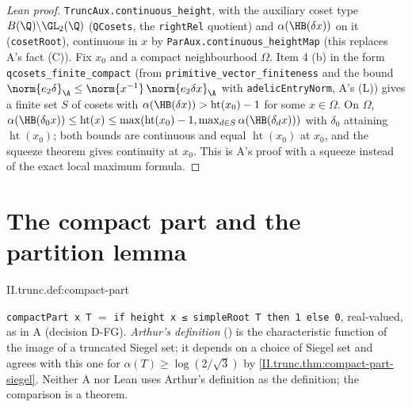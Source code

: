 \begin{proof}[Lean proof]
\texttt{TruncAux.continuous\_height}, with the auxiliary coset type $B(\Q)\backslash\GL_2(\Q)$ (\texttt{QCosets}, the \texttt{rightRel} quotient) and $\alpha(\HB(\delta x))$ on it (\texttt{cosetRoot}), continuous in $x$ by \texttt{ParAux.continuous\_heightMap} (this replaces A's fact (C)). Fix $x_0$ and a compact neighbourhood $\Omega$. Item 4 (b) in the form \texttt{qcosets\_finite\_compact} (from \texttt{primitive\_vector\_finiteness} and the bound $\norm{e_2\delta}_\A\le\norm{x^{-1}}\,\norm{e_2\delta x}_\A$ with \texttt{adelicEntryNorm}, A's (L)) gives a finite set $S$ of cosets with $\alpha(\HB(\delta x))>\operatorname{ht}(x_0)-1$ for some $x\in\Omega$. On $\Omega$, $\alpha(\HB(\delta_0x))\le\operatorname{ht}(x)\le\max(\operatorname{ht}(x_0)-1,\max_{d\in S}\alpha(\HB(\delta_dx)))$ with $\delta_0$ attaining $\operatorname{ht}(x_0)$; both bounds are continuous and equal $\operatorname{ht}(x_0)$ at $x_0$, and the squeeze theorem gives continuity at $x_0$. This is A's proof with a squeeze instead of the exact local maximum formula.
\end{proof}


\section{The compact part and the partition lemma}\label{sec:trunc-partition}

\begin{definition}
\end{definition}
\begin{tfformal}{II.trunc.def:compact-part}
\begin{tffidelity}
\texttt{compactPart x T} $=$ \texttt{if height x ≤ simpleRoot T then 1 else 0}, real-valued, as in A (decision D-FG). \emph{Arthur's definition} (\cite[§8, p.~37]{AIntro}) is the characteristic function of the image of a truncated Siegel set; it depends on a choice of Siegel set and agrees with this one for $\alpha(T)\ge\log(2/\sqrt3)$ by \cref{II.trunc.thm:compact-part-siegel}. Neither A nor Lean uses Arthur's definition as the definition; the comparison is a theorem.
\end{tffidelity}
\end{tfformal}

